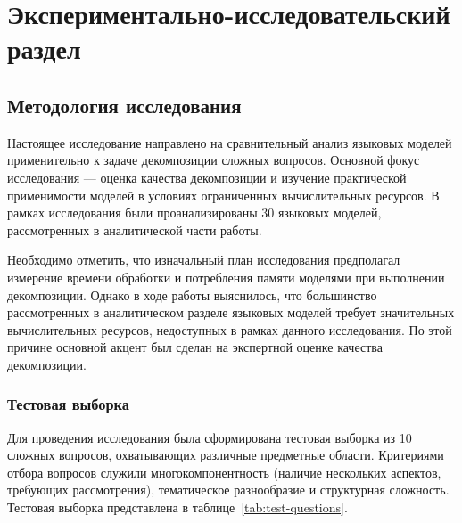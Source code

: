 \chapter{Экспериментально-исследовательский раздел}

\section{Методология исследования}
Настоящее исследование направлено на сравнительный анализ языковых моделей применительно к задаче декомпозиции сложных вопросов. Основной фокус исследования — оценка качества декомпозиции и изучение практической применимости моделей в условиях ограниченных вычислительных ресурсов. В рамках исследования были проанализированы 30 языковых моделей, рассмотренных в аналитической части работы.

Необходимо отметить, что изначальный план исследования предполагал измерение времени обработки и потребления памяти моделями при выполнении декомпозиции. Однако в ходе работы выяснилось, что большинство рассмотренных в аналитическом разделе языковых моделей требует значительных вычислительных ресурсов, недоступных в рамках данного исследования. По этой причине основной акцент был сделан на экспертной оценке качества декомпозиции.

\subsection{Тестовая выборка}
Для проведения исследования была сформирована тестовая выборка из 10 сложных вопросов, охватывающих различные предметные области. Критериями отбора вопросов служили многокомпонентность (наличие нескольких аспектов, требующих рассмотрения), тематическое разнообразие и структурная сложность. Тестовая выборка представлена в таблице~\ref{tab:test-questions}.

